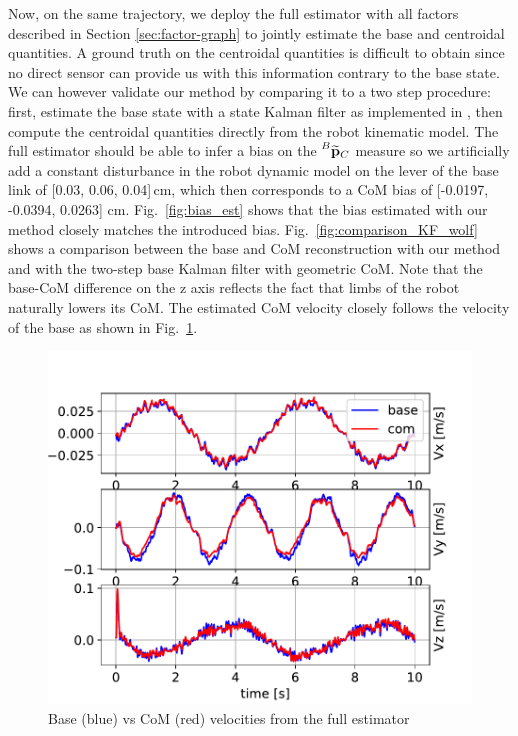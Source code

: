 Now, on the same trajectory, we deploy the full estimator with all factors described in Section \ref{sec:factor-graph} to jointly 
estimate the base and centroidal quantities. A ground truth on the centroidal quantities is difficult to obtain since no direct 
sensor can provide us with this information contrary to the base state. 
We can however validate our method by comparing it to a two step procedure: first, estimate the base state with a state Kalman filter as 
implemented in \cite{bledt2018cheetah}, then compute the centroidal quantities directly from the robot kinematic model. 
The full estimator should be able to infer a bias on the $\prescript{B}{}{\widetilde{{\bf p}}}_{C}$ measure so we artificially add a constant disturbance 
in the robot dynamic model on the lever of the base link of [0.03, 0.06, 0.04]\,cm, which then corresponds to a CoM bias of 
[-0.0197, -0.0394,  0.0263] cm. Fig.~\ref{fig:bias_est} shows that the bias estimated with our method closely matches the introduced bias. 
Fig.~\ref{fig:comparison_KF_wolf} shows a comparison between the base and CoM reconstruction with our method and with the two-step base Kalman filter 
with geometric CoM. Note that the base-CoM difference on the z axis reflects the fact that limbs of the robot naturally lowers  its CoM. 
The estimated CoM velocity closely follows the velocity of the base as shown in Fig.~\ref{fig:com_base_vel}.




\begin{figure}[t]
    \centering
    \includegraphics[height=0.6\columnwidth]{figures/centroidal/com_velocity_povcdl_sin.pdf}
    \caption{Base (blue) vs CoM (red) velocities   from the full estimator}
    \label{fig:com_base_vel}
\end{figure}


